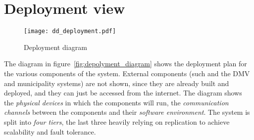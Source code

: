\section{Deployment view}
\label{sec:deployment_view}
\begin{figure}[h]
    \centering
    \texttt{[image: dd\_deployment.pdf]}
    \caption{Deployment diagram}
    \label{fig:depolyment_diagram}
\end{figure}

The diagram in figure~\vref{fig:depolyment_diagram} shows the deployment plan
for the various components of the system. External components (such and the DMV
and municipality systems) are not shown, since they are already built and
deployed, and they can just be accessed from the internet.
The diagram shows the \emph{physical devices} in which the components will run,
the \emph{communication channels} between the components and their
\emph{software environment}.
The system is split into \emph{four tiers}, the last three heavily relying on
replication to achieve scalability and fault tolerance.

